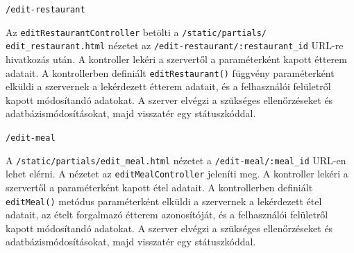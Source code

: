 \bigskip

\noindent \texttt{/edit-restaurant}

Az \texttt{editRestaurantController} betölti a \texttt{/static/partials/} \\ \texttt{edit\_restaurant.html} nézetet az \texttt{/edit-restaurant/:restaurant\_id} URL-re hivatkozás után. A kontroller lekéri a szervertől a paraméterként kapott étterem adatait. A kontrollerben definiált \texttt{editRestaurant()} függvény paraméterként elküldi a szervernek a lekérdezett étterem adatait, és a felhasználói felületről kapott módosítandó adatokat. A szerver elvégzi a szükséges ellenőrzéseket és adatbázismódosításokat, majd visszatér egy státuszkóddal.

\bigskip

\noindent \texttt{/edit-meal}

A \texttt{/static/partials/edit\_meal.html} nézetet a \texttt{/edit-meal/:meal\_id} URL-en lehet elérni. A nézetet az \texttt{editMealController} jeleníti meg. A kontroller lekéri a szervertől a paraméterként kapott étel adatait. A kontrollerben definiált \texttt{editMeal()} metódus paraméterként elküldi a szervernek a lekérdezett étel adatait, az ételt forgalmazó étterem azonosítóját, és a felhasználói felületről kapott módosítandó adatokat. A szerver elvégzi a szükséges ellenőrzéseket és adatbázismódosításokat, majd visszatér egy státuszkóddal.
